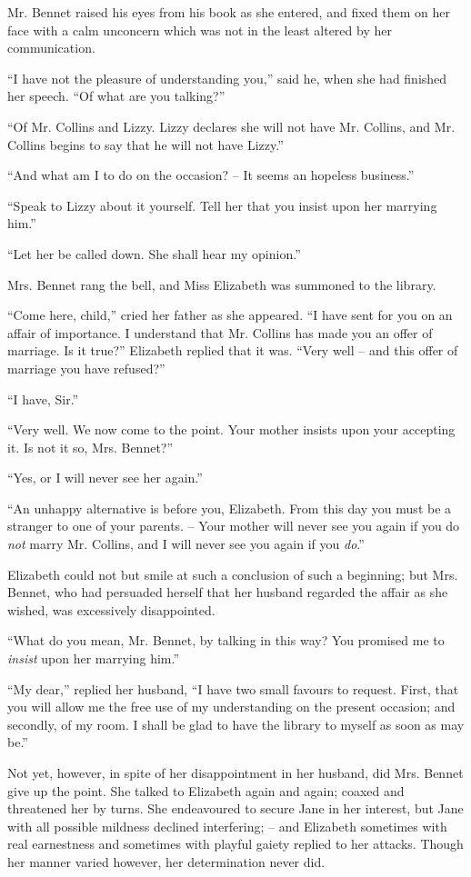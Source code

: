 Mr. Bennet raised his eyes from his book as she entered,
and fixed them on her face with a calm unconcern which
was not in the least altered by her communication.

“I have not the pleasure of understanding you,” said
he, when she had finished her speech. “Of what are you
talking?”

“Of Mr. Collins and Lizzy. Lizzy declares she will not
have Mr. Collins, and Mr. Collins begins to say that he
will not have Lizzy.”

“And what am I to do on the occasion? -- It seems an
hopeless business.”

“Speak to Lizzy about it yourself. Tell her that you
insist upon her marrying him.”

“Let her be called down. She shall hear my opinion.”

Mrs. Bennet rang the bell, and Miss Elizabeth was
summoned to the library.

“Come here, child,” cried her father as she appeared.
“I have sent for you on an affair of importance. I understand
that Mr. Collins has made you an offer of marriage.
Is it true?” Elizabeth replied that it was. “Very well -- and
this offer of marriage you have refused?”

“I have, Sir.”

“Very well. We now come to the point. Your mother
insists upon your accepting it. Is not it so, Mrs. Bennet?”

“Yes, or I will never see her again.”

“An unhappy alternative is before you, Elizabeth.
From this day you must be a stranger to one of your
parents. -- Your mother will never see you again if you
do \textit{not} marry Mr. Collins, and I will never see you again
if you \textit{do}.”

Elizabeth could not but smile at such a conclusion of
such a beginning; but Mrs. Bennet, who had persuaded
herself that her husband regarded the affair as she wished,
was excessively disappointed.

“What do you mean, Mr. Bennet, by talking in this
way? You promised me to \textit{insist} upon her marrying him.”

“My dear,” replied her husband, “I have two small
favours to request. First, that you will allow me the free
use of my understanding on the present occasion; and
secondly, of my room. I shall be glad to have the library
to myself as soon as may be.”

Not yet, however, in spite of her disappointment in her
husband, did Mrs. Bennet give up the point. She talked
to Elizabeth again and again; coaxed and threatened her
by turns. She endeavoured to secure Jane in her interest,
but Jane with all possible mildness declined interfering; -- and
Elizabeth sometimes with real earnestness and sometimes
with playful gaiety replied to her attacks. Though
her manner varied however, her determination never did.

